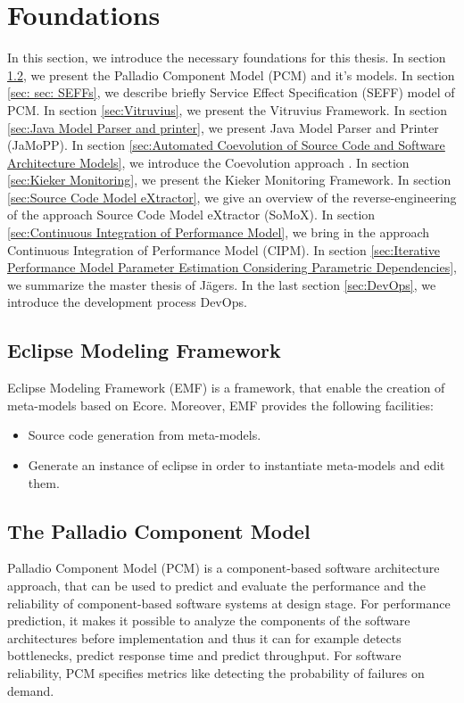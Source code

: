 

\chapter{Foundations}
\label{ch:Foundations}
In this section, we introduce the necessary foundations for this thesis. In section \ref{sec:The Palladio Component Model}, we present the Palladio Component Model (PCM) and it's models. In section \ref{sec: sec: SEFFs}, we describe briefly Service Effect Specification (SEFF) model of PCM. In section \ref{sec:Vitruvius}, we present the Vitruvius Framework. In section \ref{sec:Java Model Parser and printer}, we present Java Model Parser and Printer (JaMoPP). In section \ref{sec:Automated Coevolution of Source Code and Software Architecture Models}, we introduce the Coevolution approach \cite{langhammer2015co}. In section \ref{sec:Kieker Monitoring}, we present the Kieker Monitoring Framework. In section \ref{sec:Source Code Model eXtractor}, we give an overview of the reverse-engineering of the approach Source Code Model eXtractor (SoMoX). In section \ref{sec:Continuous Integration of Performance Model}, we bring in the approach Continuous Integration of Performance Model (CIPM). In section \ref{sec:Iterative Performance Model Parameter Estimation Considering Parametric Dependencies}, we summarize the master thesis of Jägers. In the last section \ref{sec:DevOps}, we introduce the development process DevOps.

\section{Eclipse Modeling Framework}
\label{sec:Eclipse Modeling Framework}
Eclipse Modeling Framework (EMF) is a framework, that enable the creation of meta-models based on Ecore. Moreover, EMF provides the following facilities:
\begin{itemize}
\item Source code generation from meta-models. 
\item Generate an instance of eclipse in order to instantiate meta-models and edit them.
\end{itemize}    

\section{The Palladio Component Model}
\label{sec:The Palladio Component Model}
Palladio Component Model (PCM) is a component-based software architecture approach, that can be used to predict and evaluate the performance and the reliability of component-based software systems at design stage. For performance prediction, it makes it possible to analyze the components of the software architectures before implementation and thus it can for example detects bottlenecks, predict response time and predict throughput. For software reliability, PCM specifies metrics like detecting the probability of failures on demand. 

